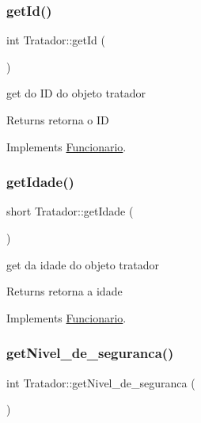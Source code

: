 \subsubsection{\texorpdfstring{getId()}{getId()}}
{\footnotesize\ttfamily int Tratador\+::get\+Id (\begin{DoxyParamCaption}{ }\end{DoxyParamCaption})\hspace{0.3cm}{\ttfamily [virtual]}}



get do ID do objeto tratador 

\begin{DoxyReturn}{Returns}
retorna o ID 
\end{DoxyReturn}


Implements \mbox{\hyperlink{class_funcionario}{Funcionario}}.

\mbox{\label{class_tratador_a4b1f53b0c58af0896e4a502f84880c1b}} 
\subsubsection{\texorpdfstring{getIdade()}{getIdade()}}
{\footnotesize\ttfamily short Tratador\+::get\+Idade (\begin{DoxyParamCaption}{ }\end{DoxyParamCaption})\hspace{0.3cm}{\ttfamily [virtual]}}



get da idade do objeto tratador 

\begin{DoxyReturn}{Returns}
retorna a idade 
\end{DoxyReturn}


Implements \mbox{\hyperlink{class_funcionario}{Funcionario}}.

\mbox{\label{class_tratador_ae2233b1cf850e3e3e183f1a934b410a6}} 
\subsubsection{\texorpdfstring{getNivel\_de\_seguranca()}{getNivel\_de\_seguranca()}}
{\footnotesize\ttfamily int Tratador\+::get\+Nivel\+\_\+de\+\_\+seguranca (\begin{DoxyParamCaption}{ }\end{DoxyParamCaption})}



